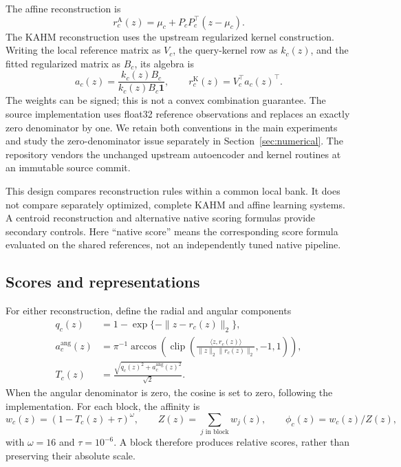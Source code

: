 \documentclass[10pt]{article}
\newcommand{\K}{\mathrm{K}}
\newcommand{\A}{\mathrm{A}}
\newcommand{\clip}{\operatorname{clip}}
\begin{document}
The affine reconstruction is
\begin{equation}\label{eq:affine}
  r^{\A}_c(z)=\mu_c+P_cP_c^\top(z-\mu_c).
\end{equation}
The KAHM reconstruction uses the upstream regularized kernel construction.
Writing the local reference matrix as $V_c$, the query-kernel row as $k_c(z)$,
and the fitted regularized matrix as $B_c$, its algebra is
\begin{equation}\label{eq:kahm}
  a_c(z)=\frac{k_c(z)B_c}{k_c(z)B_c\boldsymbol{1}},
  \qquad r^{\K}_c(z)=V_c^\top a_c(z)^\top.
\end{equation}
The weights can be signed; this is not a convex combination guarantee.
The source implementation uses float32 reference observations and replaces
an exactly zero denominator by one. We retain both conventions in the main
experiments and study the zero-denominator issue separately in
Section~\ref{sec:numerical}. The repository vendors the unchanged upstream
autoencoder and kernel routines at an immutable source commit.

This design compares reconstruction rules within a common local bank. It
does not compare separately optimized, complete KAHM and affine learning
systems. A centroid reconstruction and alternative native scoring formulas
provide secondary controls. Here ``native score'' means the corresponding
score formula evaluated on the shared references, not an independently
tuned native pipeline.

\subsection{Scores and representations}

For either reconstruction, define the radial and angular components
\begin{align}
  q_c(z)&=1-\exp\{-\|z-r_c(z)\|_2\},\\
  a_c^{\mathrm{ang}}(z)&=\pi^{-1}
       \arccos\!\left(\clip\!\left(
       \frac{\langle z,r_c(z)\rangle}
       {\|z\|_2\|r_c(z)\|_2},-1,1\right)\right),\\
  T_c(z)&=\frac{\sqrt{q_c(z)^2+
                           a_c^{\mathrm{ang}}(z)^2}}{\sqrt{2}}.
\end{align}
When the angular denominator is zero, the cosine is set to zero, following
the implementation. For each block, the affinity is
\begin{equation}\label{eq:phi}
 w_c(z)=(1-T_c(z)+\tau)^\omega,\qquad
 Z(z)=\sum_{j\text{ in block}}w_j(z),\qquad
 \phi_c(z)=w_c(z)/Z(z),
\end{equation}
with $\omega=16$ and $\tau=10^{-6}$. A block therefore produces relative
scores, rather than preserving their absolute scale.
\end{document}

